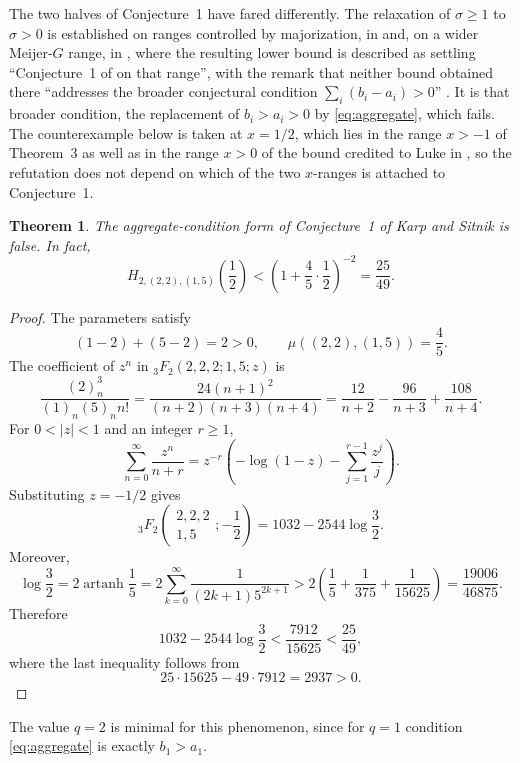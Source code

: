 \documentclass[11pt]{amsart}
\newtheorem{theorem}{Theorem}
\begin{document}
The two halves of Conjecture~1 have fared differently. The relaxation of
$\sigma\ge1$ to $\sigma>0$ is established on ranges controlled by
majorization, in \cite[Theorem~5]{KP} and, on a wider Meijer-$G$ range, in
\cite{Derbazi}, where the resulting lower bound is described as settling
``Conjecture~1 of \cite{KS} on that range'', with the remark that neither
bound obtained there ``addresses the broader conjectural condition
$\sum_i(b_i-a_i)>0$'' \cite[discussion following
Proposition~3.3]{Derbazi}. It is that broader condition, the replacement of
$b_i>a_i>0$ by \eqref{eq:aggregate}, which fails. The counterexample below
is taken at $x=1/2$, which lies in the range $x>-1$ of Theorem~3 as well as
in the range $x>0$ of the bound credited to Luke in \cite{KS}, so the
refutation does not depend on which of the two $x$-ranges is attached to
Conjecture~1.

\begin{theorem}\label{thm:counterexample}
The aggregate-condition form of Conjecture~1 of Karp and Sitnik is false.
In fact,
\[
 H_{2,(2,2),(1,5)}\!\left(\frac12\right)
 <
 \left(1+\frac45\cdot\frac12\right)^{-2}
 =\frac{25}{49}.
\]
\end{theorem}

\begin{proof}
The parameters satisfy
\[
 (1-2)+(5-2)=2>0,
 \qquad
 \mu((2,2),(1,5))=\frac45.
\]
The coefficient of $z^n$ in ${}_3F_2(2,2,2;1,5;z)$ is
\[
 \frac{(2)_n^3}{(1)_n(5)_n n!}
 =
 \frac{24(n+1)^2}{(n+2)(n+3)(n+4)}
 =
 \frac{12}{n+2}-\frac{96}{n+3}+\frac{108}{n+4}.
\]
For $0<|z|<1$ and an integer $r\ge1$,
\[
 \sum_{n=0}^{\infty}\frac{z^n}{n+r}
 =
 z^{-r}\left(
 -\log(1-z)-\sum_{j=1}^{r-1}\frac{z^j}{j}
 \right).
\]
Substituting $z=-1/2$ gives
\begin{equation}\label{eq:closed}
 {}_3F_2\!\left(
 \begin{matrix}2,2,2\\1,5\end{matrix};-\frac12
 \right)
 =
 1032-2544\log\frac32.
\end{equation}
Moreover,
\[
 \log\frac32
 =
 2\operatorname{artanh}\frac15
 =
 2\sum_{k=0}^{\infty}\frac{1}{(2k+1)5^{2k+1}}
 >
 2\left(\frac15+\frac1{375}+\frac1{15625}\right)
 =
 \frac{19006}{46875}.
\]
Therefore
\[
 1032-2544\log\frac32
 <
 \frac{7912}{15625}
 <
 \frac{25}{49},
\]
where the last inequality follows from
\[
 25\cdot15625-49\cdot7912=2937>0.
\]
\end{proof}

The value $q=2$ is minimal for this phenomenon, since for $q=1$ condition
\eqref{eq:aggregate} is exactly $b_1>a_1$.
\end{document}
